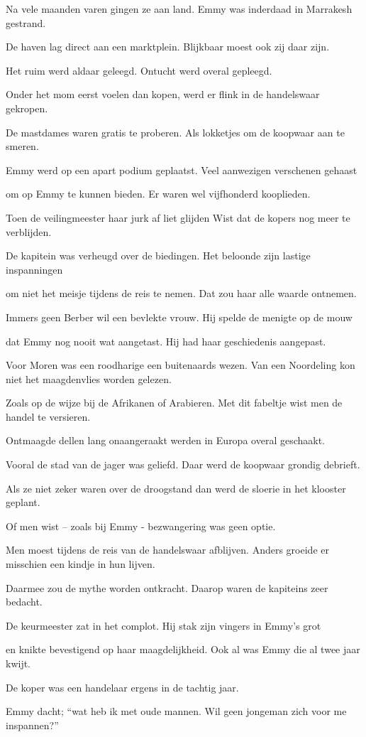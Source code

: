 Na vele maanden varen gingen ze aan land.
Emmy was inderdaad in Marrakesh gestrand.

De haven lag direct aan een marktplein.
Blijkbaar moest ook zij daar zijn.

Het ruim werd aldaar geleegd.
Ontucht werd overal gepleegd.

Onder het mom eerst voelen dan kopen,
werd er flink in de handelswaar gekropen.

De mastdames waren gratis te proberen.
Als lokketjes om de koopwaar aan te smeren.

Emmy werd op een apart podium geplaatst.
Veel aanwezigen verschenen gehaast

om op Emmy te kunnen bieden.
Er waren wel vijfhonderd kooplieden.

Toen de veilingmeester haar jurk af liet glijden
Wist dat de kopers nog meer te verblijden.

De kapitein was verheugd over de biedingen.
Het beloonde zijn lastige inspanningen

om niet het meisje tijdens de reis te nemen.
Dat zou haar alle waarde ontnemen.

Immers geen Berber wil een bevlekte  vrouw.
Hij spelde de menigte op de mouw

dat Emmy nog nooit wat aangetast.
Hij had haar geschiedenis aangepast.

Voor Moren was een roodharige een buitenaards wezen.
Van een Noordeling kon niet het maagdenvlies worden gelezen.

Zoals op de wijze bij de Afrikanen of Arabieren.
Met dit fabeltje wist men de handel te versieren.

Ontmaagde dellen lang onaangeraakt
werden in Europa overal geschaakt.

Vooral de stad van de jager was geliefd.
Daar werd de koopwaar grondig debrieft.

Als ze niet zeker waren over de droogstand
dan werd de sloerie in het klooster geplant.

Of men wist – zoals bij Emmy -
bezwangering was geen optie.

Men moest tijdens de reis van de handelswaar afblijven.
Anders groeide er misschien een kindje in hun lijven.

Daarmee zou de mythe worden ontkracht.
Daarop waren de kapiteins zeer bedacht.

De keurmeester zat in het complot.
Hij stak zijn vingers in Emmy’s grot

en knikte bevestigend op haar maagdelijkheid.
Ook al was Emmy die al twee jaar kwijt.

De koper was een handelaar
ergens in de tachtig jaar.

Emmy dacht; “wat heb ik met oude mannen.
Wil geen jongeman zich voor me inspannen?”
